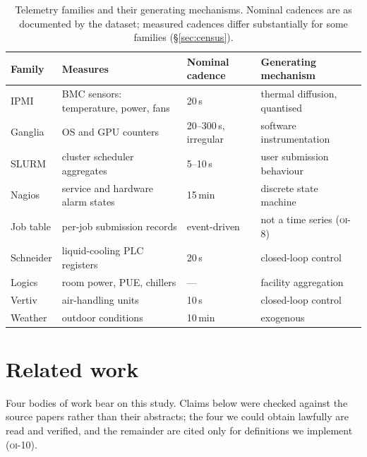 \documentclass[11pt,a4paper]{article}
\newcommand{\unit}[2]{#1\,#2}
\newcommand{\unitrange}[3]{#1--#2\,#3}
\newcommand{\oi}[1]{\textsc{oi-#1}}
\begin{document}
\begin{table}[t]
\centering
\caption{Telemetry families and their generating mechanisms. Nominal cadences
are as documented by the dataset; measured cadences differ substantially for
some families (\S\ref{sec:census}).}
\label{tab:families}
\small
\begin{tabular}{llll}
\toprule
Family & Measures & Nominal cadence & Generating mechanism \\
\midrule
IPMI      & BMC sensors: temperature, power, fans & \unit{20}{s} & thermal diffusion, quantised \\
Ganglia   & OS and GPU counters                   & \unitrange{20}{300}{s}, irregular & software instrumentation \\
SLURM     & cluster scheduler aggregates          & \unitrange{5}{10}{s} & user submission behaviour \\
Nagios    & service and hardware alarm states     & \unit{15}{min} & discrete state machine \\
Job table & per-job submission records            & event-driven & not a time series (\oi{8}) \\
Schneider & liquid-cooling PLC registers          & \unit{20}{s} & closed-loop control \\
Logics    & room power, PUE, chillers             & --- & facility aggregation \\
Vertiv    & air-handling units                    & \unit{10}{s} & closed-loop control \\
Weather   & outdoor conditions                    & \unit{10}{min} & exogenous \\
\bottomrule
\end{tabular}
\end{table}

\section{Related work}
\label{sec:related}

Four bodies of work bear on this study. Claims below were checked against the
source papers rather than their abstracts; the four we could obtain lawfully are
read and verified, and the remainder are cited only for definitions we
implement (\oi{10}).
\end{document}

